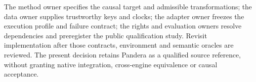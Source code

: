 The method owner specifies the causal target and admissible transformations;
the data owner supplies trustworthy keys and clocks; the adapter owner freezes
the execution profile and failure contract; the rights and evaluation owners
resolve dependencies and preregister the public qualification study. Revisit
implementation after those contracts, environment and semantic oracles are
reviewed. The present decision retains Pandera as a qualified source reference,
without granting native integration, cross-engine equivalence or causal acceptance.
